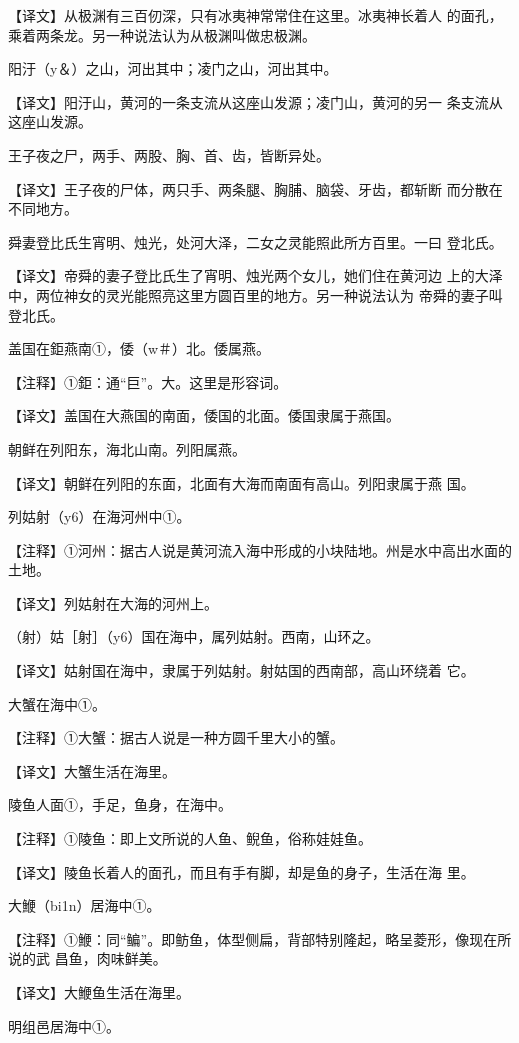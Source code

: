 \documentclass[a4paper,12pt,UTF8,twoside]{ctexbook}
\begin{document}
【译文】从极渊有三百仞深，只有冰夷神常常住在这里。冰夷神长着人 的面孔，乘着两条龙。另一种说法认为从极渊叫做忠极渊。

阳汙（y＆）之山，河出其中；凌门之山，河出其中。

【译文】阳汙山，黄河的一条支流从这座山发源；凌门山，黄河的另一 条支流从这座山发源。

王子夜之尸，两手、两股、胸、首、齿，皆断异处。

【译文】王子夜的尸体，两只手、两条腿、胸脯、脑袋、牙齿，都斩断 而分散在不同地方。

舜妻登比氏生宵明、烛光，处河大泽，二女之灵能照此所方百里。一曰 登北氏。

【译文】帝舜的妻子登比氏生了宵明、烛光两个女儿，她们住在黄河边 上的大泽中，两位神女的灵光能照亮这里方圆百里的地方。另一种说法认为 帝舜的妻子叫登北氏。

盖国在鉅燕南①，倭（w＃）北。倭属燕。

【注释】①鉅：通“巨”。大。这里是形容词。

【译文】盖国在大燕国的南面，倭国的北面。倭国隶属于燕国。

朝鲜在列阳东，海北山南。列阳属燕。

【译文】朝鲜在列阳的东面，北面有大海而南面有高山。列阳隶属于燕 国。

列姑射（y6）在海河州中①。

【注释】①河州：据古人说是黄河流入海中形成的小块陆地。州是水中高出水面的土地。

【译文】列姑射在大海的河州上。

（射）姑［射］（y6）国在海中，属列姑射。西南，山环之。

【译文】姑射国在海中，隶属于列姑射。射姑国的西南部，高山环绕着 它。

大蟹在海中①。

【注释】①大蟹：据古人说是一种方圆千里大小的蟹。

【译文】大蟹生活在海里。

陵鱼人面①，手足，鱼身，在海中。

【注释】①陵鱼：即上文所说的人鱼、鲵鱼，俗称娃娃鱼。

【译文】陵鱼长着人的面孔，而且有手有脚，却是鱼的身子，生活在海 里。

大鯾（bi1n）居海中①。

【注释】①鯾：同“鳊”。即鲂鱼，体型侧扁，背部特别隆起，略呈菱形，像现在所说的武 昌鱼，肉味鲜美。

【译文】大鯾鱼生活在海里。

明组邑居海中①。
\end{document}
